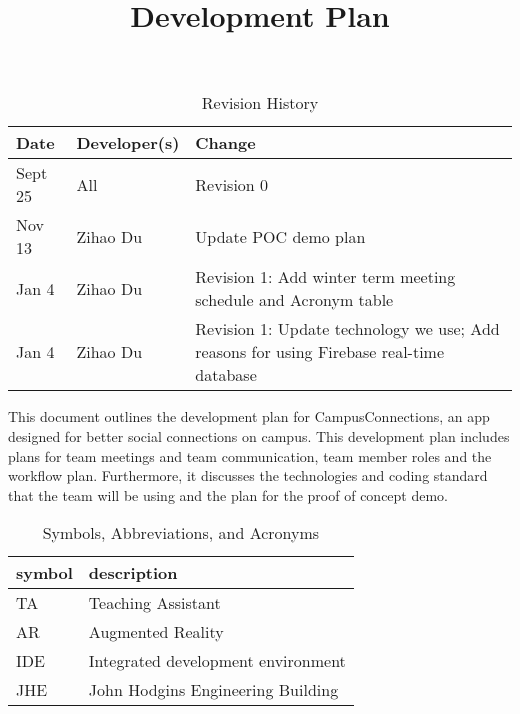 \documentclass{article}
\title{Development Plan\\\progname}
\author{\authname}
\date{}
\begin{document}
\maketitle

\begin{table}[hp]
\caption{Revision History} \label{TblRevisionHistory}
\begin{tabularx}{\textwidth}{llX}
\toprule
\textbf{Date} & \textbf{Developer(s)} & \textbf{Change}\\
\midrule
Sept 25 & All & Revision 0\\
Nov 13 & Zihao Du & Update POC demo plan\\
Jan 4 & Zihao Du & Revision 1: Add winter term meeting schedule and Acronym table\\
Jan 4 & Zihao Du & Revision 1: Update technology we use; Add reasons for using Firebase real-time database\\
\bottomrule
\end{tabularx}
\end{table}

This document outlines the development plan for CampusConnections, an app designed for better social connections on campus. This development plan includes plans for team meetings and team communication, team member roles and the workflow plan.  Furthermore,  it discusses the technologies and coding standard that the team will be using and the plan for the proof of concept demo. 

\begin{table}[H]
\center
\caption{Symbols, Abbreviations, and Acronyms} \label{Acronyms}
\begin{tabular}{l l} 
  \toprule		
  \textbf{symbol} & \textbf{description}\\
  \midrule 
  TA & Teaching Assistant\\
  \midrule
  AR & Augmented Reality\\
  \midrule
  IDE & Integrated development environment\\
  \midrule
  JHE & John Hodgins Engineering Building\\
  \bottomrule
\end{tabular}\\
\end{table}
\newpage
\end{document}
